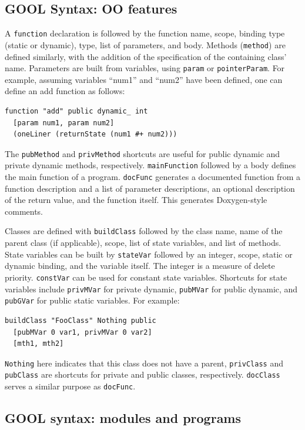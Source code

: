 \documentclass[sigplan,review,anonymous,prologue,dvipsnames]{acmart}
\begin{document}
\subsection{GOOL Syntax: OO features}

A \verb|function| declaration is followed by the function
name, scope, binding type (static or dynamic), type, list of parameters, and
body. Methods (\verb|method|) are defined similarly, with the addition of the
specification of the containing class' name.  Parameters are built from
variables, using \verb|param| or \verb|pointerParam|. For example, assuming
variables ``num1'' and ``num2'' have been defined, one can define an
\textsf{add} function as follows:
\begin{lstlisting}
function "add" public dynamic_ int
  [param num1, param num2]
  (oneLiner (returnState (num1 #+ num2)))
\end{lstlisting}
The  \verb|pubMethod| and \verb|privMethod| shortcuts are useful for public
dynamic and private dynamic methods, respectively. \verb|mainFunction|
followed by a body defines the main function of a program. \verb|docFunc|
generates a documented function from a function description and
a list of parameter descriptions, an optional description of the return
value, and the function itself.  This generates Doxygen-style comments.

Classes are defined with \verb|buildClass| followed by the class name, name of
the parent class (if applicable), scope, list of state variables, and list of
methods. State variables can be built by \verb|stateVar| followed by an
integer, scope, static or dynamic binding, and the variable itself. The integer
is a measure of delete priority. \verb|constVar| can be used for constant state
variables. Shortcuts for state variables include \verb|privMVar| for private
dynamic, \verb|pubMVar| for public dynamic, and \verb|pubGVar| for public
static variables. For example:
\begin{lstlisting}
buildClass "FooClass" Nothing public
  [pubMVar 0 var1, privMVar 0 var2]
  [mth1, mth2]
\end{lstlisting}
\verb|Nothing| here indicates that this class does not have a parent,
\verb|privClass| and \verb|pubClass| are shortcuts for private and public
classes, respectively. \verb|docClass| serves a similar purpose as \verb|docFunc|.

\subsection{GOOL syntax: modules and programs}
\end{document}
